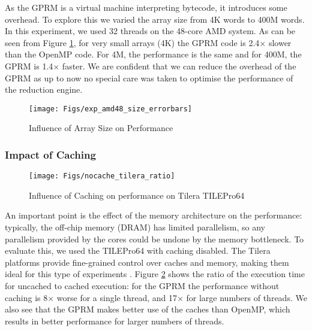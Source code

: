 \documentclass[copyright,creativecommons]{eptcs}
\begin{document}
As the GPRM is a virtual machine interpreting bytecode, it introduces
some overhead. To explore this we varied the array size from 4K words
to 400M words. In this experiment, we used 32 threads on the 48-core
AMD system. As can be seen from Figure \ref{fig:Influence-of-Array},
for very small arrays (4K) the GPRM code is 2.4$\times$ slower than
the OpenMP code. For 4M, the performance is the same and for 400M,
the GPRM is 1.4$\times$ faster. We are confident that we can reduce
the overhead of the GPRM as up to now no special care was taken to
optimise the performance of the reduction engine.

\begin{figure}[H]
\begin{centering}
\texttt{[image: Figs/exp\_amd48\_size\_errorbars]}
\par\end{centering}

\caption{\label{fig:Influence-of-Array}Influence of Array Size on Performance}
\end{figure}



\subsubsection{Impact of Caching}

\begin{figure}[H]
\begin{centering}
\texttt{[image: Figs/nocache\_tilera\_ratio]}
\par\end{centering}

\caption{\label{fig:Speedup-cache}Influence of Caching on performance on Tilera
TILEPro64}
\end{figure}


An important point is the effect of the memory architecture on the
performance: typically, the off-chip memory (DRAM) has limited parallelism,
so any parallelism provided by the cores could be undone by the memory
bottleneck. To evaluate this, we used the TILEPro64 with caching disabled.
The Tilera platforms provide fine-grained control over caches and
memory, making them ideal for this type of experiments \cite{wentzlaff2007chip}.
Figure \ref{fig:Speedup-cache} shows the ratio of the execution time
for uncached to cached execution: for the GPRM the performance without
caching is 8$\times$ worse for a single thread, and 17$\times$ for
large numbers of threads. We also see that the GPRM makes better use
of the caches than OpenMP, which results in better performance for
larger numbers of threads.
\end{document}
